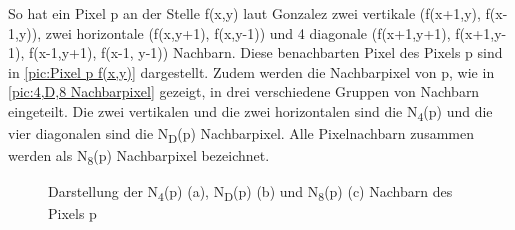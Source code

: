 \documentclass[ngerman,12pt]{article} %
\begin{document}
So hat ein Pixel p an der Stelle f(x,y) laut Gonzalez zwei vertikale (f(x+1,y), f(x-1,y)), zwei horizontale (f(x,y+1), f(x,y-1)) und 4 diagonale (f(x+1,y+1), f(x+1,y-1), f(x-1,y+1), f(x-1, y-1)) Nachbarn. Diese benachbarten Pixel des Pixels p sind in \autoref{pic:Pixel p f(x,y)} dargestellt. Zudem werden die Nachbarpixel von p, wie in \autoref{pic:4,D,8 Nachbarpixel} gezeigt, in drei verschiedene Gruppen von Nachbarn eingeteilt. Die zwei vertikalen und die zwei horizontalen sind die N\textsubscript{4}(p) und die vier diagonalen sind die N\textsubscript{D}(p) Nachbarpixel. Alle Pixelnachbarn zusammen werden als N\textsubscript{8}(p) Nachbarpixel bezeichnet.\\

\begin{figure}[h!tb]
  \centering
  \qquad
  \qquad
 \caption[Darstellung der  N\textsubscript{4}(p), N\textsubscript{D}(p) und  N\textsubscript{8}(p) Nachbarn des Pixels p]{\label{pic:4,D,8 Nachbarpixel}Darstellung der N\textsubscript{4}(p) (a), N\textsubscript{D}(p) (b) und  N\textsubscript{8}(p) (c) Nachbarn des Pixels p}
\end{figure}
\end{document}
